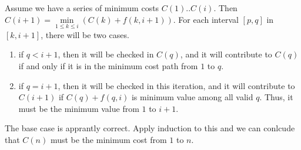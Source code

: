 \documentclass[12pt,letterpaper]{article}
\begin{document}
Assume we have a series of minimum costs $C(1)..C(i)$. Then $C(i+1)=\underset{1\leq k\leq i}{\min}(C(k)+f(k,i+1))$. For each interval $[p,q]$ in $[k,i+1]$, there will be two cases.
\begin{enumerate}
	\item if $q<i+1$, then it will be checked in $C(q)$, and it will contribute to $C(q)$ if and only if it is in the minimum cost path from $1$ to $q$.\\
	\item if $q=i+1$, then it will be checked in this iteration, and it will contribute to $C(i+1)$ if $C(q)+f(q,i)$ is minimum value among all valid $q$. Thus, it must be the minimum value from $1$ to $i+1$.\\
\end{enumerate}
The base case is apprantly correct. Apply induction to this and we can conlcude that $C(n)$ must be the minimum cost from $1$ to $n$.
\end{document}
